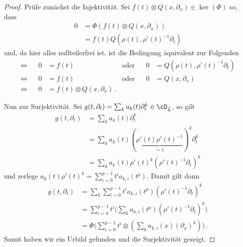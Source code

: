 \begin{proof}
Prüfe zunächst die Injektivität. Sei $f(t)\otimes Q(x,\partial_x)\in
\ker(\Phi)$ so, dass
\begin{align*}
0 &= \Phi(f(t)\otimes Q(x,\partial_x))
\\&= f(t)Q(\rho(t),\rho'(t)^{-1}\partial_t)
\end{align*}
und, da hier alles nullteilerfrei ist, ist die Bedingung äquivalent zur
Folgenden
\begin{align*}
\Leftrightarrow && 0&=f(t) &\text{oder}&& 0&=Q(\rho(t),\rho'(t)^{-1}\partial_t)
\\\Leftrightarrow && 0&=f(t) &\text{oder}&& 0&=Q(x,\partial_x)
\\\Leftrightarrow&& 0&=f(t)\otimes Q(x,\partial_x) \,.
\end{align*}
\begin{comment} TODO: korrekt? \end{comment}
Nun zur Surjektivität.
Sei $g(t,\partial_t)=\sum_ka_k(t)\partial_t^k\in\cD_{\hat L}$, so gilt
\begin{align*}
g(t,\partial_t)&=\sum_ka_k(t)\partial_t^k
\\&=\sum_ka_k(t)(\underset{=1}{\underbrace{\rho'(t)\rho'(t)^{-1}}})^k
  \partial_t^k
\\&=\sum_ka_k(t)\rho'(t)^k(\rho'(t)^{-1} \partial_t)^k
\end{align*}
und zerlege $a_k(t)\rho'(t)^k=\sum_{i=0}^{p-1}t^ia_{k,i}(t^p)$. Damit gilt dann
\begin{align*}
g(t,\partial_t)&= \sum_k\sum_{i=0}^{p-1}t^ia_{k,i}(t^p)
  (\rho'(t)^{-1} \partial_t)^k
\\&= \sum_{i=0}^{p-1}t^i\Big(\sum_ka_{k,i}(t^p)
  (\rho'(t)^{-1} \partial_t)^k\Big)
\\&= \Phi\Big(\sum_{i=0}^{p-1}t^i\otimes(\sum_ka_{k,i}(x)
  (\partial_x)^k)\Big) \,.
\end{align*}
Somit haben wir ein Urbild gefunden und die Surjektivität gezeigt.
\end{proof}

